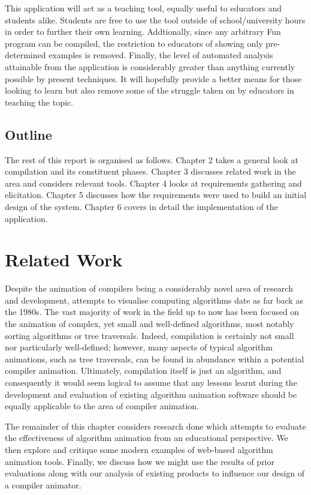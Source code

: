 \documentclass{l4proj}
\begin{document}
This application will act as a teaching tool, equally useful to educators and students alike. Students are free to use the tool outside of school/university hours in order to further their own learning. Addtionally, since any arbitrary Fun program can be compiled, the restriction to educators of showing only pre-determined examples is removed. Finally, the level of automated analysis attainable from the application is considerably greater than anything currently possible by present techniques. It will hopefully provide a better means for those looking to learn but also remove some of the struggle taken on by educators in teaching the topic.

\section{Outline}
The rest of this report is organised as follows. Chapter 2 takes a general look at compilation and its constituent phases. Chapter 3 discusses related work in the area and considers relevant tools. Chapter 4 looks at requirements gathering and elicitation. Chapter 5 discusses how the requirements were used to build an initial design of the system. Chapter 6 covers in detail the implementation of the application.

\chapter{Related Work}
Despite the animation of compilers being a considerably novel area of research and development, attempts to visualise computing algorithms date as far back as the 1980s\cite{BentleyKernighan}. The vast majority of work in the field up to now has been focused on the animation of complex, yet small and well-defined algorithms, most notably sorting algorithms or tree traversals. Indeed, compilation is certainly not small nor particularly well-defined; however, many aspects of typical algorithm animations, such as tree traversals, can be found in abundance within a potential compiler animation. Ultimately, compilation itself is just an algorithm,  and consequently it would seem logical to assume that any lessons learnt during the development and evaluation of existing algorithm animation software should be equally applicable to the area of compiler animation. 

The remainder of this chapter considers research done which attempts to evaluate the effectiveness of algorithm animation from an educational perspective. We then explore and critique some modern examples of web-based algorithm animation tools. Finally, we discuss how we might use the results of prior evaluations along with our analysis of existing products to influence our design of a compiler animator.
\end{document}
